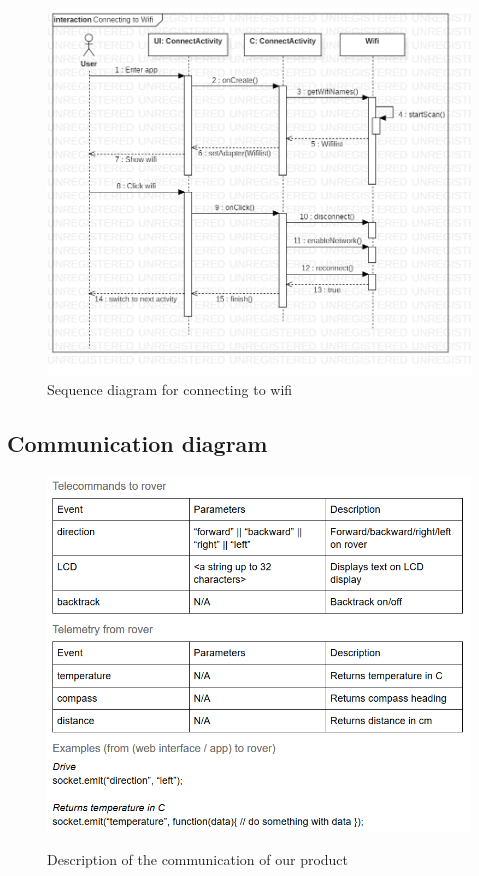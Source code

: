 \documentclass[12pt]{article}
\begin{document}
	\begin{figure}[H]
		\includegraphics[width=\linewidth]{SequenceDiagram6.png}
		\caption{Sequence diagram for connecting to wifi}
	\end{figure}
 	\subsection{Communication diagram}
 	\begin{figure}[H]
 		\centering
 		\includegraphics[width=\linewidth]{ComDiagram.png}\\
 		\caption{Description of the communication of our product}
 	\end{figure}
\end{document}
